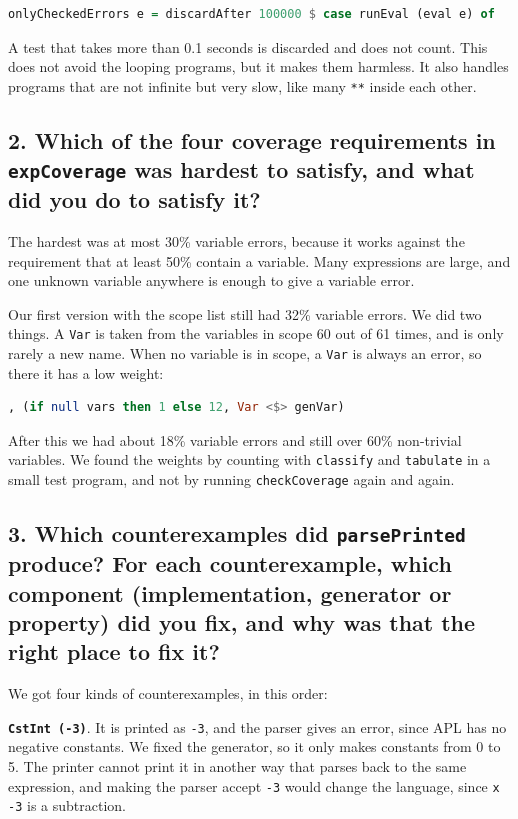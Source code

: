 \begin{lstlisting}[language=Haskell]
onlyCheckedErrors e = discardAfter 100000 $ case runEval (eval e) of
\end{lstlisting}

A test that takes more than 0.1 seconds is discarded and does not count. This does not avoid the looping programs, but it makes them harmless. It also handles programs that are not infinite but very slow, like many \texttt{**} inside each other.

\subsection[Question 2]{2. Which of the four coverage requirements in \texttt{expCoverage} was hardest to satisfy, and what did you do to satisfy it?}

The hardest was at most 30\% variable errors, because it works against the requirement that at least 50\% contain a variable. Many expressions are large, and one unknown variable anywhere is enough to give a variable error.

Our first version with the scope list still had 32\% variable errors. We did two things. A \texttt{Var} is taken from the variables in scope 60 out of 61 times, and is only rarely a new name. When no variable is in scope, a \texttt{Var} is always an error, so there it has a low weight:

\begin{lstlisting}[language=Haskell]
, (if null vars then 1 else 12, Var <$> genVar)
\end{lstlisting}

After this we had about 18\% variable errors and still over 60\% non-trivial variables. We found the weights by counting with \texttt{classify} and \texttt{tabulate} in a small test program, and not by running \texttt{checkCoverage} again and again.

\subsection[Question 3]{3. Which counterexamples did \texttt{parsePrinted} produce? For each counterexample, which component (implementation, generator or property) did you fix, and why was that the right place to fix it?}

We got four kinds of counterexamples, in this order:

\textbf{\texttt{CstInt (-3)}}. It is printed as \texttt{-3}, and the parser gives an error, since APL has no negative constants. We fixed the generator, so it only makes constants from 0 to 5. The printer cannot print it in another way that parses back to the same expression, and making the parser accept \texttt{-3} would change the language, since \texttt{x -3} is a subtraction.

